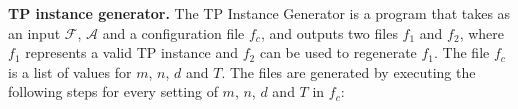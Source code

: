 \documentclass{mpaper}
\begin{document}




\textbf{TP instance generator.}
The TP Instance Generator is a program that takes as an input $\mathcal{F}$, $\mathcal{A}$ and a configuration file $f_c$, and outputs two files $f_1$ and $f_2$, where $f_1$ represents a valid TP instance and $f_2$ can be used to regenerate $f_1$. The file $f_c$ is a list of values for $m$, $n$, $d$ and $T$. The files are generated by executing the following steps for every setting of $m$, $n$, $d$ and $T$ in $f_c$:
\end{document}
